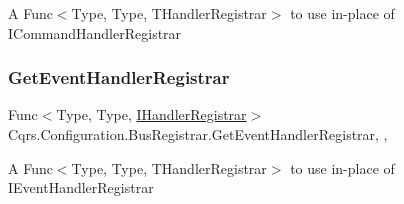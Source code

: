 A Func$<$\+Type, Type, T\+Handler\+Registrar$>$ to use in-\/place of I\+Command\+Handler\+Registrar 

\mbox{\label{classCqrs_1_1Configuration_1_1BusRegistrar_adaab0236b3ce39214ce60b2272e5ab19_adaab0236b3ce39214ce60b2272e5ab19}} 
\subsubsection{\texorpdfstring{Get\+Event\+Handler\+Registrar}{GetEventHandlerRegistrar}}
{\footnotesize\ttfamily Func$<$Type, Type, \hyperlink{interfaceCqrs_1_1Bus_1_1IHandlerRegistrar}{I\+Handler\+Registrar}$>$ Cqrs.\+Configuration.\+Bus\+Registrar.\+Get\+Event\+Handler\+Registrar\hspace{0.3cm}{\ttfamily [static]}, {\ttfamily [get]}, {\ttfamily [set]}}



A Func$<$\+Type, Type, T\+Handler\+Registrar$>$ to use in-\/place of I\+Event\+Handler\+Registrar 

